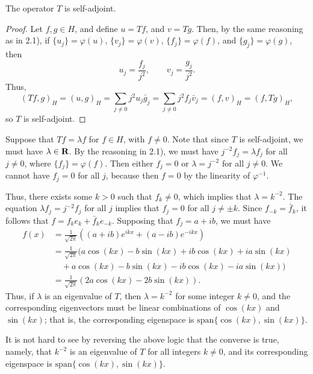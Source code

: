 \documentclass{homework}
\begin{document}
\begin{arabicparts}
		\questionpart The operator $T$ is self-adjoint.
		\begin{proof}
			Let $f,g \in H$, and define $u = Tf$, and $v = Tg$. Then, by the same reasoning as in 2.1), if $\{u_j\} = \varphi(u)$, $\{v_j\} = \varphi(v)$, $\{f_j\} = \varphi(f)$, and $\{g_j\} = \varphi(g)$, then
			\begin{equation}
				u_j = \frac{f_j}{j^2}, \qquad v_j = \frac{g_j}{j^2}.
			\end{equation}
			Thus,
			\begin{equation}
				(Tf, g)_H = (u, g)_H = \sum_{j\ne0}j^2u_j\bar{g}_j = \sum_{j\ne0}j^2f_j\bar{v}_j = (f,v)_H = (f,Tg)_H,
			\end{equation}
			so $T$ is self-adjoint.
		\end{proof}
		
		\questionpart
		Suppose that $Tf = \lambda f$ for $f \in H$, with $f\ne0$. Note that since $T$ is self-adjoint, we must have $\lambda \in \textnormal{\bf R}$. By the reasoning in 2.1), we must have $j^{-2}f_j = \lambda f_j$ for all $j\ne0$, where $\{f_j\} = \varphi(f)$. Then either $f_j = 0$ or $\lambda = j^{-2}$ for all $j \ne 0$. We cannot have $f_j = 0$ for all $j$, because then $f = 0$ by the linearity of $\varphi^{-1}$.
		
		Thus, there exists some $k > 0$ such that $f_{k} \ne0$, which implies that $\lambda = k^{-2}$. The equation $\lambda f_j = j^{-2}f_j$ for all $j$ implies that $f_j = 0$ for all $j \ne \pm k$. Since $f_{-k} = \bar{f}_{k}$, it follows that $f = f_{k}e_{k} + \bar{f}_ke_{-k}$. Supposing that $f_j = a + ib$, we must have
		\begin{align}
			f(x) &= \frac{1}{\sqrt{2\pi}}\left((a+ib)e^{ikx} + (a-ib)e^{-ikx}\right) \\
			&= \frac{1}{\sqrt{2\pi}}\big(a\cos(kx) - b\sin(kx) +ib\cos(kx) + ia\sin(kx)\\
			&\quad{}+ a\cos(kx) -b\sin(kx) - ib\cos(kx) -ia\sin(kx)\big) \\
			&= \frac{1}{\sqrt{2\pi}}\left(2a\cos(kx) - 2b\sin(kx)\right).
		\end{align}
		Thus, if $\lambda$ is an eigenvalue of $T$, then $\lambda = k^{-2}$ for some integer $k\ne0$, and the corresponding eigenvectors must be linear combinations of $\cos(kx)$ and $\sin(kx)$; that is, the corresponding eigenspace is $\mathrm{span}\{\cos(kx), \sin(kx)\}$. 
		
		It is not hard to see by reversing the above logic that the converse is true, namely, that $k^{-2}$ is an eigenvalue of $T$ for all integers $k \ne0$, and its corresponding eigenspace is $\mathrm{span}\{\cos(kx),\sin(kx)\}$.
		

\end{arabicparts}
\end{document}
